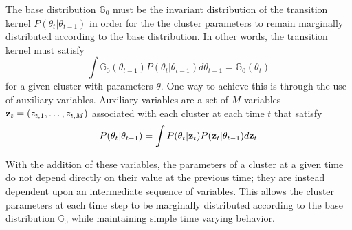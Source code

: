 \documentclass{article}
\begin{document}
The base distribution $\mathbb{G}_{0}$ must be the invariant distribution of the transition kernel $P(\theta_{t} | \theta_{t-1})$ in order for the the cluster parameters to remain marginally distributed according to the base distribution. In other words, the transition kernel must satisfy
\begin{equation}
\int \mathbb{G}_{0}(\theta_{t-1})P(\theta_{t} | \theta_{t-1}) d\theta_{t-1} = \mathbb{G}_{0}(\theta_{t})
\end{equation}
for a given cluster with parameters $\theta$. One way to achieve this is through the use of auxiliary variables. Auxiliary variables are a set of $M$ variables $\bold{z}_{t} = (z_{t,1}, \ldots, z_{t,M})$ associated with each cluster at each time $t$ that satisfy
\begin{eqnarray}
\label{auxiliaryvariablecriteria}
P(\theta_{t} | \theta_{t-1}) = \int P(\theta_{t} | \bold{z}_{t}) P(\bold{z}_{t} | \theta_{t-1}) d \bold{z}_{t}
\end{eqnarray}

With the addition of these variables, the parameters of a cluster at a given time do not depend directly on their value at the previous time; they are instead dependent upon an intermediate sequence of variables. This allows the cluster parameters at each time step to be marginally distributed according to the base distribution $\mathbb{G}_{0}$ while maintaining simple time varying behavior.
\end{document}
